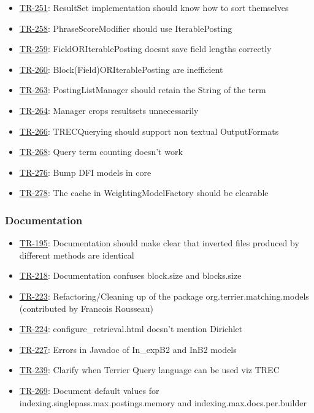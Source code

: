 \begin{itemize}
\item
  \href{http://terrier.org/issues/browse/TR-251}{TR-251}: ResultSet
  implementation should know how to sort themselves
\item
  \href{http://terrier.org/issues/browse/TR-258}{TR-258}:
  PhraseScoreModifier should use IterablePosting
\item
  \href{http://terrier.org/issues/browse/TR-259}{TR-259}:
  FieldORIterablePosting doesnt save field lengths correctly
\item
  \href{http://terrier.org/issues/browse/TR-260}{TR-260}:
  Block(Field)ORIterablePosting are inefficient
\item
  \href{http://terrier.org/issues/browse/TR-263}{TR-263}:
  PostingListManager should retain the String of the term
\item
  \href{http://terrier.org/issues/browse/TR-264}{TR-264}: Manager crops
  resultsets unnecessarily
\item
  \href{http://terrier.org/issues/browse/TR-266}{TR-266}: TRECQuerying
  should support non textual OutputFormats
\item
  \href{http://terrier.org/issues/browse/TR-268}{TR-268}: Query term
  counting doesn't work
\item
  \href{http://terrier.org/issues/browse/TR-276}{TR-276}: Bump DFI
  models in core
\item
  \href{http://terrier.org/issues/browse/TR-278}{TR-278}: The cache in
  WeightingModelFactory should be clearable
\end{itemize}

\subsubsection{Documentation}\label{documentation}

\begin{itemize}
\tightlist
\item
  \href{http://terrier.org/issues/browse/TR-195}{TR-195}: Documentation
  should make clear that inverted files produced by different methods
  are identical
\item
  \href{http://terrier.org/issues/browse/TR-218}{TR-218}: Documentation
  confuses block.size and blocks.size
\item
  \href{http://terrier.org/issues/browse/TR-223}{TR-223}:
  Refactoring/Cleaning up of the package org.terrier.matching.models
  (contributed by Francois Rousseau)
\item
  \href{http://terrier.org/issues/browse/TR-224}{TR-224}:
  configure\_retrieval.html doesn't mention Dirichlet
\item
  \href{http://terrier.org/issues/browse/TR-227}{TR-227}: Errors in
  Javadoc of In\_expB2 and InB2 models
\item
  \href{http://terrier.org/issues/browse/TR-239}{TR-239}: Clarify when
  Terrier Query language can be used viz TREC
\item
  \href{http://terrier.org/issues/browse/TR-269}{TR-269}: Document
  default values for indexing.singlepass.max.postings.memory and
  indexing.max.docs.per.builder
\end{itemize}

